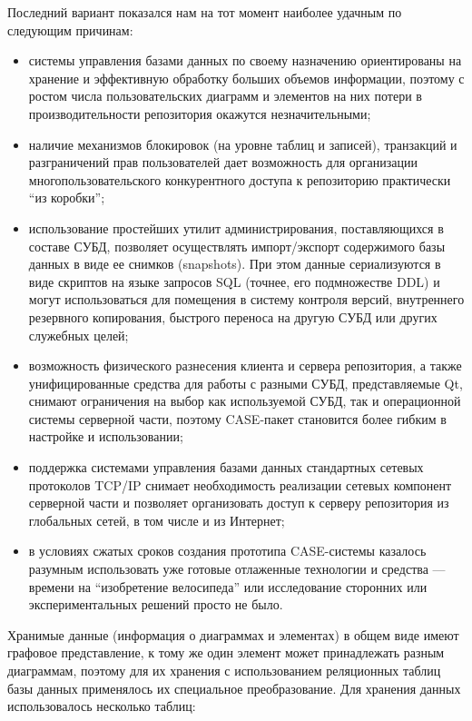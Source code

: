 \documentclass[a5paper]{article}
\begin{document}
Последний вариант показался нам на тот момент наиболее удачным по
следующим причинам:

\begin{itemize}
  \item системы управления базами данных по своему назначению ориентированы на
        хранение и эффективную обработку больших объемов информации, поэтому с
        ростом числа пользовательских диаграмм и элементов на них потери в
        производительности репозитория окажутся незначительными;
  \item наличие механизмов блокировок (на уровне таблиц и записей), транзакций и
        разграничений прав пользователей дает возможность для организации
        многопользовательского конкурентного доступа к репозиторию практически
        ``из коробки'';
  \item использование простейших утилит администрирования, поставляющихся в
        составе СУБД, позволяет осуществлять импорт/экспорт содержимого базы
        данных в виде ее снимков (snapshots). При
        этом данные сериализуются в виде скриптов на языке запросов
        SQL (точнее, его подмножестве DDL) и могут использоваться для помещения в
        систему контроля версий, внутреннего резервного копирования, быстрого
        переноса на другую СУБД или других служебных целей;
  \item возможность физического разнесения клиента и сервера репозитория, а
        также унифицированные средства для работы с разными СУБД,
        представляемые Qt, снимают
        ограничения на выбор как используемой СУБД, так и операционной системы
        серверной части, поэтому CASE-пакет
        становится более гибким в настройке и использовании;
  \item поддержка системами управления базами данных стандартных сетевых
        протоколов TCP/IP снимает необходимость реализации сетевых компонент серверной части и
        позволяет организовать доступ к серверу репозитория из глобальных
        сетей, в том числе и из Интернет;
  \item в условиях сжатых сроков создания прототипа
        CASE-системы казалось разумным использовать уже готовые отлаженные технологии и средства
        --- времени на ``изобретение велосипеда'' или исследование сторонних или
        экспериментальных решений просто не было.
\end{itemize}

Хранимые данные (информация о диаграммах и элементах) в общем виде имеют
графовое представление, к тому же один элемент может принадлежать
разным диаграммам, поэтому для их хранения с использованием реляционных
таблиц базы данных применялось их специальное преобразование. Для
хранения данных использовалось несколько таблиц:
\end{document}
